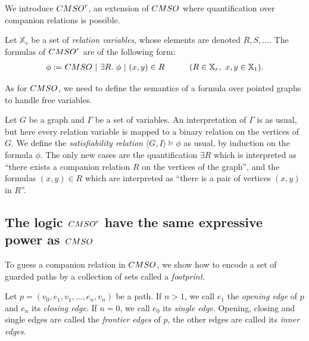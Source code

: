 We introduce $\CMSO^r$, an extension of $\CMSO$ where quantification over companion relations is possible.

\begin{definition} 
  Let $\mathbb{X}_r$ be a set of \emph{relation variables}, whose elements are denoted $R, S, \dots$. The formulas of $\CMSO^r$ are of the following form:
\begin{align*}
 \phi :=&\ \CMSO\ |\ \exists R.\ \phi\ |\ (x,y)\in R & \qquad (R\in \mathbb{X}_r,\ x,y\in\mathbb{X}_1).
\end{align*}
\end{definition}
 
 As for $\CMSO$, we need to define the semantics of a formula over pointed graphs to handle free variables.
 
\begin{definition}
Let $G$ be a graph and $\Gamma$ be a set of variables.  An interpretation of $\Gamma$ is as usual, but here every relation variable is mapped to a binary relation on the vertices of $G$.  We define the \emph{satisfiability relation} $\langle G, I\rangle\models \phi$ as usual, by induction on the formula $\phi$. The only new cases are the quantification  $\exists R$ which is interpreted as ``there exists a companion relation $R$ on the vertices of the graph'', and the formulas $(x,y)\in R$ which are interpreted as ``there is a pair of vertices $(x,y)$ in $R$''. 
\end{definition}


\subsection{The logic $\CMSO^r$ have the same expressive power as $\CMSO$}



To guess a companion relation in $\CMSO$, we show how to encode a set of guarded paths by a collection of sets called a \emph{footprint}.


\begin{definition} Let $p=(v_0,e_1,v_1,\dots,e_n,v_n)$ be a path. If $n>1$, we call $e_1$ the \emph{opening edge} of $p$ and $e_n$ its \emph{closing edge}. If $n=0$, we call $e_0$ its \emph{single edge}.  Opening, closing and single edges are called the \emph{frontier edges} of $p$, the other edges are called its \emph{inner edges}.  
 \end{definition}


